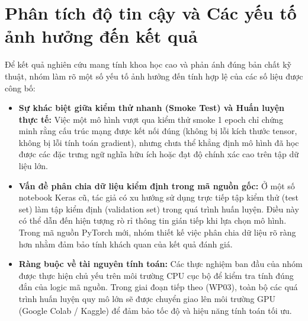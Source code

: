 \section{Phân tích độ tin cậy và Các yếu tố ảnh hưởng đến kết quả}
Để kết quả nghiên cứu mang tính khoa học cao và phản ánh đúng bản chất kỹ thuật, nhóm làm rõ một số yếu tố ảnh hưởng đến tính hợp lệ của các số liệu được công bố:
\begin{itemize}
\item \textbf{Sự khác biệt giữa kiểm thử nhanh (Smoke Test) và Huấn luyện thực tế:} Việc một mô hình vượt qua kiểm thử smoke 1 epoch chỉ chứng minh rằng cấu trúc mạng được kết nối đúng (không bị lỗi kích thước tensor, không bị lỗi tính toán gradient), nhưng chưa thể khẳng định mô hình đã học được các đặc trưng ngữ nghĩa hữu ích hoặc đạt độ chính xác cao trên tập dữ liệu lớn.
\item \textbf{Vấn đề phân chia dữ liệu kiểm định trong mã nguồn gốc:} Ở một số notebook Keras cũ, tác giả có xu hướng sử dụng trực tiếp tập kiểm thử (test set) làm tập kiểm định (validation set) trong quá trình huấn luyện. Điều này có thể dẫn đến hiện tượng rò rỉ thông tin gián tiếp khi lựa chọn mô hình. Trong mã nguồn PyTorch mới, nhóm thiết kế việc phân chia dữ liệu rõ ràng hơn nhằm đảm bảo tính khách quan của kết quả đánh giá.
\item \textbf{Ràng buộc về tài nguyên tính toán:} Các thực nghiệm ban đầu của nhóm được thực hiện chủ yếu trên môi trường CPU cục bộ để kiểm tra tính đúng đắn của logic mã nguồn. Trong giai đoạn tiếp theo (WP03), toàn bộ các quá trình huấn luyện quy mô lớn sẽ được chuyển giao lên môi trường GPU (Google Colab / Kaggle) để đảm bảo tốc độ và hiệu năng tính toán tối ưu.
\end{itemize}

